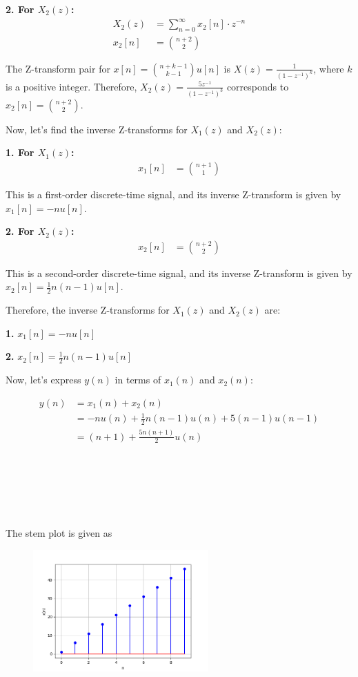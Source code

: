 \documentclass[journal,12pt,twocolumn]{IEEEtran}
\theoremstyle{remark}
\begin{document}
\textbf{2. For \(X_2(z)\):}
\begin{align}
    X_2(z) &= \sum_{n=0}^{\infty} x_2[n] \cdot z^{-n} \\
    x_2[n] &= \binom{n+2}{2}
\end{align}

The Z-transform pair for \(x[n] = \binom{n+k-1}{k-1}u[n]\) is \(X(z) = \frac{1}{{(1 - z^{-1})^k}}\), where \(k\) is a positive integer. Therefore, \(X_2(z) = \frac{5z^{-1}}{{(1 - z^{-1})^3}}\) corresponds to \(x_2[n] = \binom{n+2}{2}\).

Now, let's find the inverse Z-transforms for \(X_1(z)\) and \(X_2(z)\):

\textbf{1. For \(X_1(z)\):}
\begin{align}
    x_1[n] &= \binom{n+1}{1}
\end{align}

This is a first-order discrete-time signal, and its inverse Z-transform is given by \(x_1[n] = -nu[n]\).

\textbf{2. For \(X_2(z)\):}
\begin{align}
    x_2[n] &= \binom{n+2}{2}
\end{align}

This is a second-order discrete-time signal, and its inverse Z-transform is given by \(x_2[n] = \frac{1}{2}n(n-1)u[n]\).

Therefore, the inverse Z-transforms for \(X_1(z)\) and \(X_2(z)\) are:

\textbf{1.} \(x_1[n] = -nu[n]\)

\textbf{2.} \(x_2[n] = \frac{1}{2}n(n-1)u[n]\)

Now, let's express \(y(n)\) in terms of \(x_1(n)\) and \(x_2(n)\):

\begin{align}
    y(n) &= x_1(n) + x_2(n) \\
    &= -nu(n) + \frac{1}{2}n(n-1)u(n) + 5(n-1)u(n-1) \\
    &= (n+1) + \frac{5n(n+1)}{2}u(n)
\end{align}
\\\\\\
\\\\\\
The stem plot is given as

\begin{figure}[h]
  \centering
  \includegraphics[width=0.6\textwidth]{figs/stem.png}
  \label{fig:Stem_Plot}
\end{figure}
\end{document}
